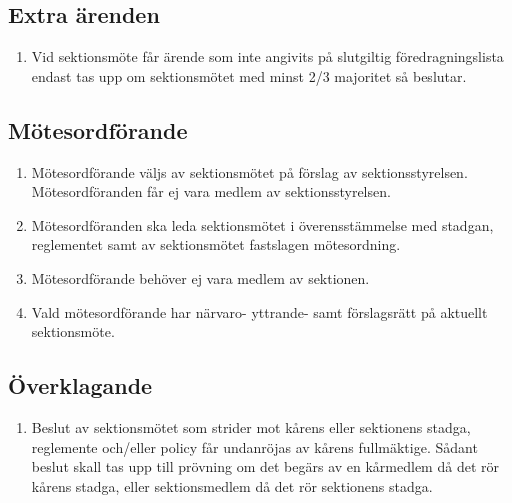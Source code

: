\documentclass[11pt,a4paper]{article}
\begin{document}
\subsection{Extra ärenden}

\begin{enumerate}[\thesubsection .1]

  \item Vid sektionsmöte får ärende som inte angivits på slutgiltig
  före\-drag\-nings\-lista endast tas upp om sektionsmötet med minst 2/3 majoritet så beslutar.

\end{enumerate}

\subsection{Mötesordförande}

\begin{enumerate}[\thesubsection .1]

  \item Mötes\-ord\-förande väljs av sektionsmötet på förslag av
   sektionsstyrelsen. Mötes\-ord\-föranden får ej vara medlem av sektionsstyrelsen.

  \item Mötesordföranden ska leda sektionsmötet i överensstämmelse med
  st\-ad\-gan, reglementet samt av sektionsmötet fastslagen mötesordning.

\item Mötesordförande behöver ej vara medlem av sektionen.

\item Vald mötesordförande har närvaro- yttrande- samt förslagsrätt på aktuellt sektionsmöte.

\end{enumerate}

\subsection{Överklagande}

\begin{enumerate}[\thesubsection .1]

  \item Beslut av sektionsmötet som strider mot kårens eller
  sektionens stad\-ga, reglemente och/eller policy får undanröjas av
  kårens fullmäktige. Så\-dant beslut skall tas upp till prövning om det begärs av en kår\-med\-lem då det rör kårens stadga, eller
  sektionsmedlem då det rör sektion\-ens stadga.

\end{enumerate}
\end{document}

